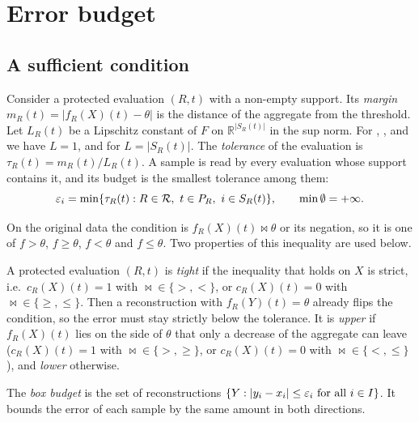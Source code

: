 \section{Error budget}
\label{sec:budget}

\subsection{A sufficient condition}

Consider a protected evaluation $(R,t)$ with a non-empty support. Its
\emph{margin} $m_R(t) = |f_R(X)(t) - \theta|$ is the distance of the
aggregate from the threshold. Let $L_R(t)$ be a Lipschitz constant of $F$
on $\mathbb{R}^{|S_R(t)|}$ in the sup norm. For ,
,  and 
we have $L = 1$, and for  $L = |S_R(t)|$. The
\emph{tolerance} of the evaluation is $\tau_R(t) = m_R(t)/L_R(t)$. A sample
is read by every evaluation whose support contains it, and its budget is
the smallest tolerance among them:
\begin{equation}
  \eps_i = \min\{\tau_R(t) : R \in \R,\ t \in P_R,\ i \in S_R(t)\},
  \qquad \min\emptyset = +\infty .
  \label{eq:budget}
\end{equation}

On the original data the condition is $f_R(X)(t) \bowtie \theta$ or its
negation, so it is one of $f > \theta$, $f \ge \theta$, $f < \theta$ and
$f \le \theta$. Two properties of this inequality are used below.

\begin{definition}
\label{def:tight}
A protected evaluation $(R,t)$ is \emph{tight} if the inequality that holds
on $X$ is strict, i.e.\ $c_R(X)(t) = 1$ with ${\bowtie} \in \{>,<\}$, or
$c_R(X)(t) = 0$ with ${\bowtie} \in \{\ge,\le\}$. Then a reconstruction with
$f_R(Y)(t) = \theta$ already flips the condition, so the error must stay
strictly below the tolerance. It is \emph{upper} if $f_R(X)(t)$ lies on
the side of $\theta$ that only a decrease of the aggregate can leave
($c_R(X)(t) = 1$ with ${\bowtie} \in \{>,\ge\}$, or $c_R(X)(t) = 0$ with
${\bowtie} \in \{<,\le\}$), and \emph{lower} otherwise.
\end{definition}

The \emph{box budget} is the set of reconstructions
$\{Y : |y_i - x_i| \le \varepsilon_i \text{ for all } i \in I\}$. It bounds the
error of each sample by the same amount in both directions.

